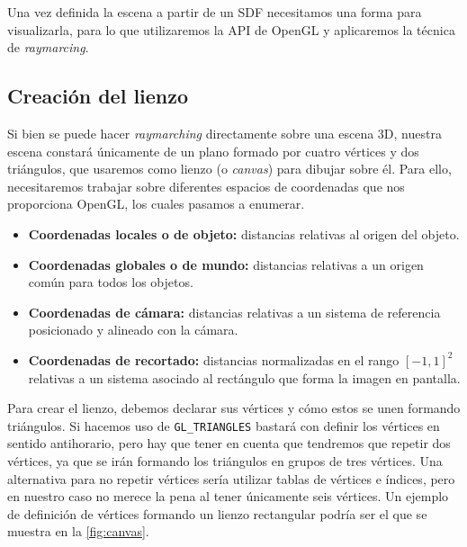 Una vez definida la escena a partir de un SDF necesitamos una forma para visualizarla, para lo que utilizaremos la API de OpenGL \cite{opengl} y aplicaremos la técnica de \textit{raymarcing}. 

\subsection{Creación del lienzo}
Si bien se puede hacer \textit{raymarching} directamente sobre una escena 3D, nuestra escena constará únicamente de un plano formado por cuatro vértices y dos triángulos, que usaremos como lienzo  (o \textit{canvas}) para dibujar sobre él. Para ello, necesitaremos trabajar sobre diferentes espacios de coordenadas que nos proporciona OpenGL, los cuales pasamos a enumerar.
\begin{itemize}
    \item \textbf{Coordenadas locales o de objeto:} distancias relativas al origen del objeto.
    \item \textbf{Coordenadas globales o de mundo:} distancias relativas a un origen común para todos los objetos.
    \item \textbf{Coordenadas de cámara:} distancias relativas a un sistema de referencia posicionado y alineado con la cámara.
    \item \textbf{Coordenadas de recortado:} distancias normalizadas en el rango $[-1,1]^2$ relativas a un sistema asociado al rectángulo que forma la imagen en pantalla.
\end{itemize}

Para crear el lienzo, debemos declarar sus vértices y cómo estos se unen formando triángulos. Si hacemos uso de \texttt{GL\_TRIANGLES} bastará con definir los vértices en sentido antihorario, pero hay que tener en cuenta que tendremos que repetir dos vértices, ya que se irán formando los triángulos en grupos de tres vértices. Una alternativa para no repetir vértices sería utilizar tablas de vértices e índices, pero en nuestro caso no merece la pena al tener únicamente seis vértices. Un ejemplo de definición de vértices formando un lienzo rectangular podría ser el que se muestra en la \autoref{fig:canvas}.\newline


